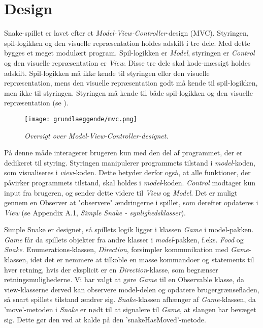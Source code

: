 \section{Design}
Snake-spillet er lavet efter et \textit{Model-View-Controller}-design (MVC). Styringen, spil-logikken og den visuelle repræsentation holdes adskilt i tre dele. Med dette bygges et meget modulært program. Spil-logikken er \textit{Model}, styringen er \textit{Control} og den visuelle repræsentation er \textit{View}. Disse tre dele skal kode-mæssigt holdes adskilt. Spil-logikken må ikke kende til styringen eller den visuelle repræsentation, mens den visuelle repræsentation godt må kende til spil-logikken, men ikke til styringen. Styringen må kende til både spil-logikken og den visuelle repræsentation (se ).
\newline

\begin{figure}[h]
	\centering
   	\texttt{[image: grundlaeggende/mvc.png]}

	\caption{\textit{Oversigt over Model-View-Controller-designet.}}
\end{figure}

På denne måde interagerer brugeren kun med den del af programmet, der er dedikeret til styring. Styringen manipulerer programmets tilstand i \textit{model}-koden, som visualiseres i \textit{view}-koden. Dette betyder derfor også, at alle funktioner, der påvirker programmets tilstand, skal holdes i \textit{model}-koden. \textit{Control} modtager kun input fra brugeren, og sender dette videre til \textit{View} og \textit{Model}. Det er muligt gennem en Observer at "observere" ændringerne i spillet, som derefter opdateres i \textit{View} (se Appendix A.1, \textit{Simple Snake - synlighedsklasser}).
\newline

Simple Snake er designet, så spillets logik ligger i klassen \textit{Game} i model-pakken. \textit{Game} får da spillets objekter fra andre klasser i \textit{model}-pakken, f.eks. \textit{Food} og \textit{Snake}. Enumerations-klassen, \textit{Direction}, forsimpler kommunikation med \textit{Game}-klassen, idet det er nemmere at tilkoble en masse kommandoer og statements til hver retning, hvis der eksplicit er en \textit{Direction}-klasse, som begrænser retningsmulighederne. Vi har valgt at gøre \textit{Game} til en Observable klasse, da view-klasserne derved kan observere model-delen og opdatere brugergrænsefladen, så snart spillets tilstand ændrer sig. \textit{Snake}-klassen afhænger af \textit{Game}-klassen, da 'move'-metoden i \textit{Snake} er nødt til at signalere til \textit{Game}, at slangen har bevæget sig. Dette gør den ved at kalde på den 'snakeHasMoved'-metode.

